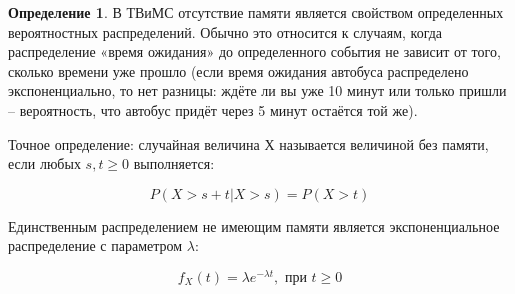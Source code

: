 \documentclass[a4paper,12pt]{article}
\theoremstyle{definition}
\newtheorem{definition}{Определение}[section]
\begin{document}
\begin{definition}\label{def:memoryless_distr}
    В ТВиМС отсутствие памяти является свойством определенных вероятностных распределений. Обычно это относится к случаям, когда распределение «время ожидания» до определенного события не зависит от того, сколько времени уже прошло (если время ожидания автобуса распределено экспоненциально, то нет разницы: ждёте ли вы уже 10 минут или только пришли – вероятность, что автобус придёт через 5 минут остаётся той же).

    Точное определение: случайная величина Х называется величиной без памяти, если любых $s,t \ge 0$ выполняется:
    
    \begin{equation}\label{eq:memoryless_d_prob}
        P(X > s + t | X > s)  = P(X > t)
    \end{equation}
    
    Единственным распределением не имеющим памяти является экспоненциальное распределение с параметром $\lambda$: 
    
    \begin{equation*}
        f_X (t) = \lambda e^{-\lambda t}, \textbf{\ при\ } t \ge 0
    \end{equation*}
    
\end{definition}
\end{document}
